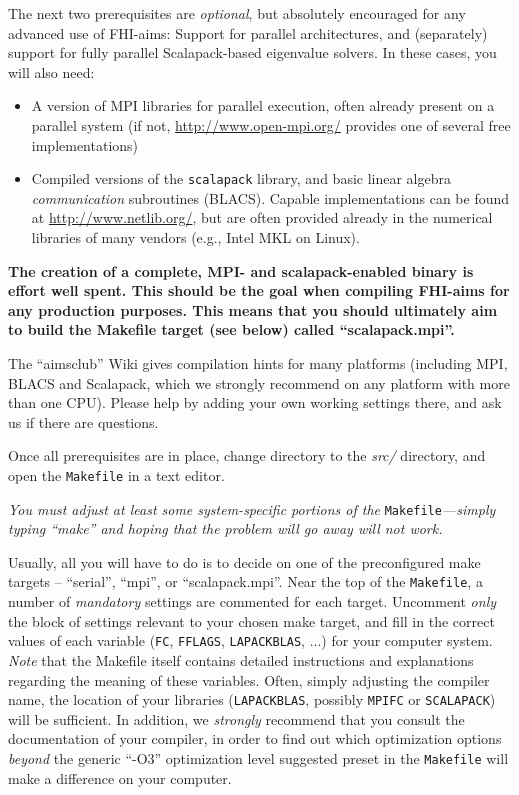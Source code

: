 The next two prerequisites are \emph{optional}, but absolutely
encouraged for any advanced use of FHI-aims: Support for parallel
architectures, and (separately) support for fully parallel
Scalapack-based eigenvalue solvers. In these cases, you will also
need: 
\begin{itemize}
  \item A version of MPI libraries for parallel execution, often already
    present on a parallel system (if not,
    \url{http://www.open-mpi.org/} provides one of several free implementations)
  \item Compiled versions of the \texttt{scalapack} library, and
     basic linear algebra \emph{communication} subroutines (BLACS). Capable
     implementations can be found at \url{http://www.netlib.org/}, but
     are often provided already in the numerical libraries of many
     vendors (e.g., Intel MKL on Linux).
\end{itemize}
\textbf{The creation of a complete, MPI- and scalapack-enabled binary
  is effort well spent. This should be the goal when compiling FHI-aims
  for any production purposes. This means that you should ultimately
  aim to build the Makefile target (see below) called ``scalapack.mpi''.} 

The ``aimsclub'' Wiki gives compilation hints for many platforms
(including MPI, BLACS and Scalapack, which we strongly recommend on
any platform with more than one CPU). Please help by adding your own
working settings there, and ask us if there are questions.

Once all prerequisites are in place, change directory to the \emph{src/}
directory, and open the \texttt{Makefile} in a text editor. 

\begin{center}
  \parbox[c]{0.8\textwidth}
  {
  \emph{You must
  adjust at least some system-specific portions of the} \texttt{Makefile}\emph{---simply typing
  ``make'' and hoping that the problem will go away will not work.}
  }
\end{center}

Usually, all you will have to do is to decide on one of the preconfigured make
targets -- ``serial'', ``mpi'', or ``scalapack.mpi''. Near the top of the
\texttt{Makefile}, a number of \emph{mandatory} settings are commented for each
target. Uncomment \emph{only} the block of settings relevant to your chosen
make target, and fill in the correct values of each variable (\texttt{FC},
\texttt{FFLAGS}, \texttt{LAPACKBLAS}, ...) for your computer
system. \emph{Note} that the Makefile itself contains detailed instructions
and explanations regarding the meaning of these variables. Often, simply
adjusting the compiler name, the location of your libraries
(\texttt{LAPACKBLAS}, possibly \texttt{MPIFC} or \texttt{SCALAPACK}) will be
sufficient. In addition, we \emph{strongly} recommend that you consult the
documentation of  your compiler, in order to find out which optimization
options \emph{beyond} the generic ``-O3'' optimization level suggested preset in the
\texttt{Makefile} will make a  difference on your computer.

